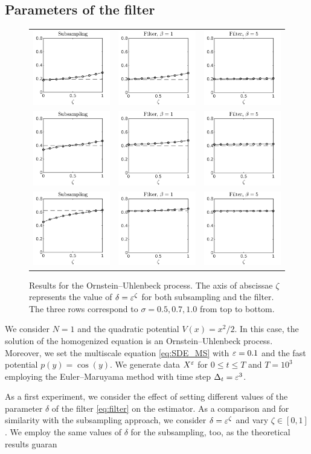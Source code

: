 \documentclass[10pt]{article}
\begin{document}
\subsection{Parameters of the filter}
\begin{figure}[t]
	\centering
	\begin{tabular}{ccc}
		\includegraphics[]{Figures/OUSubs_s5} & \includegraphics[]{Figures/OUFilt_s5_b1}  & \includegraphics[]{Figures/OUFilt_s5_b5} \\ %
		\includegraphics[]{Figures/OUSubs_s7} & \includegraphics[]{Figures/OUFilt_s7_b1}  & \includegraphics[]{Figures/OUFilt_s7_b5} \\ %
		\includegraphics[]{Figures/OUSubs_s10} & \includegraphics[]{Figures/OUFilt_s10_b1}  & \includegraphics[]{Figures/OUFilt_s10_b5} %
	\end{tabular}
	\caption{Results for the Ornstein--Uhlenbeck process. The axis of abscissae $\zeta$ represents the value of $\delta = \varepsilon^\zeta$ for both subsampling and the filter. The three rows correspond to $\sigma = 0.5, 0.7, 1.0$ from top to bottom.}
	\label{fig:OU}
\end{figure}
We consider $N = 1$ and the quadratic potential $V(x) = x^2/2$. In this case, the solution of the homogenized equation is an Ornstein--Uhlenbeck process. Moreover, we set the multiscale equation \eqref{eq:SDE_MS} with $\varepsilon = 0.1$ and the fast potential $p(y) = \cos(y)$. We generate data $X^\varepsilon$ for $0 \leq t \leq T$ and $T = 10^3$ employing the Euler--Maruyama method with time step $\Delta_t = \varepsilon^3$. 

As a first experiment, we consider the effect of setting different values of the parameter $\delta$ of the filter \eqref{eq:filter} on the estimator. As a comparison and for similarity with the subsampling approach, we consider $\delta = \varepsilon^{\zeta}$ and vary $\zeta \in [0, 1]$. We employ the same values of $\delta$ for the subsampling, too, as the theoretical results guaran
\end{document}
